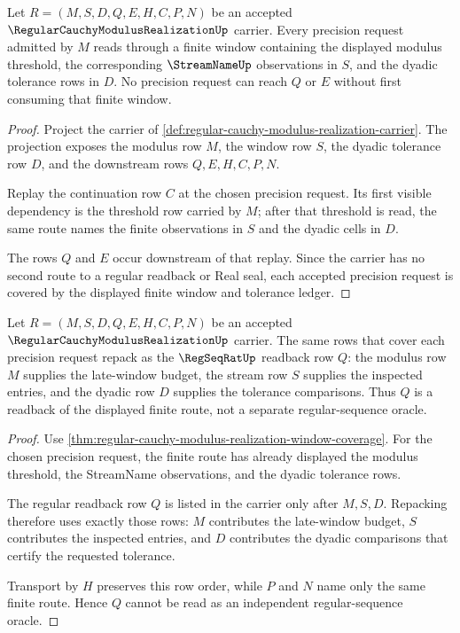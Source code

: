 \begin{theorem}
\label{thm:regular-cauchy-modulus-realization-window-coverage}
Let $R=(M,S,D,Q,E,H,C,P,N)$ be an accepted $\RegularCauchyModulusRealizationUp$ carrier. Every precision request admitted by $M$ reads through a finite window containing the displayed modulus threshold, the corresponding $\StreamNameUp$ observations in $S$, and the dyadic tolerance rows in $D$. No precision request can reach $Q$ or $E$ without first consuming that finite window.
\end{theorem}
\begin{proof}
Project the carrier of \autoref{def:regular-cauchy-modulus-realization-carrier}. The projection exposes the modulus row $M$, the window row $S$, the dyadic tolerance row $D$, and the downstream rows $Q,E,H,C,P,N$.

Replay the continuation row $C$ at the chosen precision request. Its first visible dependency is the threshold row carried by $M$; after that threshold is read, the same route names the finite observations in $S$ and the dyadic cells in $D$.

The rows $Q$ and $E$ occur downstream of that replay. Since the carrier has no second route to a regular readback or Real seal, each accepted precision request is covered by the displayed finite window and tolerance ledger.
\end{proof}

\begin{theorem}
\label{thm:regular-cauchy-modulus-realization-regseqrat-handoff}
Let $R=(M,S,D,Q,E,H,C,P,N)$ be an accepted $\RegularCauchyModulusRealizationUp$ carrier. The same rows that cover each precision request repack as the $\RegSeqRatUp$ readback row $Q$: the modulus row $M$ supplies the late-window budget, the stream row $S$ supplies the inspected entries, and the dyadic row $D$ supplies the tolerance comparisons. Thus $Q$ is a readback of the displayed finite route, not a separate regular-sequence oracle.
\end{theorem}
\begin{proof}
Use \autoref{thm:regular-cauchy-modulus-realization-window-coverage}. For the chosen precision request, the finite route has already displayed the modulus threshold, the StreamName observations, and the dyadic tolerance rows.

The regular readback row $Q$ is listed in the carrier only after $M,S,D$. Repacking therefore uses exactly those rows: $M$ contributes the late-window budget, $S$ contributes the inspected entries, and $D$ contributes the dyadic comparisons that certify the requested tolerance.

Transport by $H$ preserves this row order, while $P$ and $N$ name only the same finite route. Hence $Q$ cannot be read as an independent regular-sequence oracle.
\end{proof}

